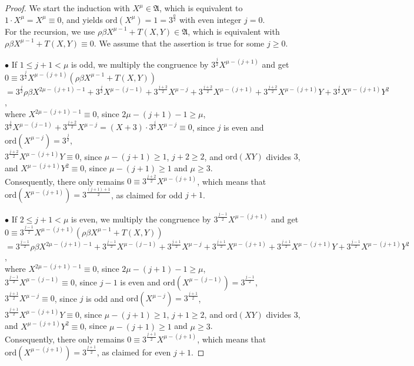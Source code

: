 \documentclass{amsart}
\theoremstyle{definition}
\numberwithin{equation}{section}
\begin{document}
\begin{proof}
We start the induction with \(X^\mu\in\mathfrak{A}\), which is equivalent to
\(1\cdot X^\mu=X^\mu\equiv 0\), and yields
\(\mathrm{ord}(X^\mu)=1=3^{\frac{0}{2}}\) with even integer \(j=0\).\\
For the recursion, we use \(\rho\beta X^{\mu-1}+T(X,Y)\in\mathfrak{A}\),
which is equivalent with \(\rho\beta X^{\mu-1}+T(X,Y)\equiv 0\).
We assume that the assertion is true for some \(j\ge 0\).

\(\bullet\)
If \(1\le j+1<\mu\) is odd, we multiply the congruence by \(3^{\frac{j}{2}}X^{\mu-(j+1)}\) and get\\
\(0\equiv 3^{\frac{j}{2}}X^{\mu-(j+1)}\left(\rho\beta X^{\mu-1}+T(X,Y)\right)\)\\
\(=3^{\frac{j}{2}}\rho\beta X^{2\mu-(j+1)-1}+3^{\frac{j}{2}}X^{\mu-(j-1)}+3^{\frac{j+2}{2}}X^{\mu-j}+3^{\frac{j+2}{2}}X^{\mu-(j+1)}
+3^{\frac{j+2}{2}}X^{\mu-(j+1)}Y+3^{\frac{j}{2}}X^{\mu-(j+1)}Y^2\),\\
where \(X^{2\mu-(j+1)-1}\equiv 0\), since \(2\mu-(j+1)-1\ge\mu\),\\
\(3^{\frac{j}{2}}X^{\mu-(j-1)}+3^{\frac{j+2}{2}}X^{\mu-j}=(X+3)\cdot 3^{\frac{j}{2}}X^{\mu-j}\equiv 0\),
since \(j\) is even and \(\mathrm{ord}(X^{\mu-j})=3^{\frac{j}{2}}\),\\
\(3^{\frac{j+2}{2}}X^{\mu-(j+1)}Y\equiv 0\), since \(\mu-(j+1)\ge 1\), \(j+2\ge 2\), and \(\mathrm{ord}(XY)\) divides \(3\),\\
and \(X^{\mu-(j+1)}Y^2\equiv 0\), since \(\mu-(j+1)\ge 1\) and \(\mu\ge 3\).\\
Consequently, there only remains \(0\equiv 3^{\frac{j+2}{2}}X^{\mu-(j+1)}\), which means that
\(\mathrm{ord}(X^{\mu-(j+1)})=3^{\frac{(j+1)+1}{2}}\), as claimed for odd \(j+1\).

\(\bullet\)
If \(2\le j+1<\mu\) is even, we multiply the congruence by \(3^{\frac{j-1}{2}}X^{\mu-(j+1)}\) and get\\
\(0\equiv 3^{\frac{j-1}{2}}X^{\mu-(j+1)}\left(\rho\beta X^{\mu-1}+T(X,Y)\right)\)\\
\(=3^{\frac{j-1}{2}}\rho\beta X^{2\mu-(j+1)-1}+3^{\frac{j-1}{2}}X^{\mu-(j-1)}+3^{\frac{j+1}{2}}X^{\mu-j}+3^{\frac{j+1}{2}}X^{\mu-(j+1)}
+3^{\frac{j+1}{2}}X^{\mu-(j+1)}Y+3^{\frac{j-1}{2}}X^{\mu-(j+1)}Y^2\),\\
where \(X^{2\mu-(j+1)-1}\equiv 0\), since \(2\mu-(j+1)-1\ge\mu\),\\
\(3^{\frac{j-1}{2}}X^{\mu-(j-1)}\equiv 0\),
since \(j-1\) is even and \(\mathrm{ord}(X^{\mu-(j-1)})=3^{\frac{j-1}{2}}\),\\
\(3^{\frac{j+1}{2}}X^{\mu-j}\equiv 0\),
since \(j\) is odd and \(\mathrm{ord}(X^{\mu-j})=3^{\frac{j+1}{2}}\),\\
\(3^{\frac{j+1}{2}}X^{\mu-(j+1)}Y\equiv 0\), since \(\mu-(j+1)\ge 1\), \(j+1\ge 2\), and \(\mathrm{ord}(XY)\) divides \(3\),\\
and \(X^{\mu-(j+1)}Y^2\equiv 0\), since \(\mu-(j+1)\ge 1\) and \(\mu\ge 3\).\\
Consequently, there only remains \(0\equiv 3^{\frac{j+1}{2}}X^{\mu-(j+1)}\), which means that
\(\mathrm{ord}(X^{\mu-(j+1)})=3^{\frac{j+1}{2}}\), as claimed for even \(j+1\).


\end{proof}
\end{document}
